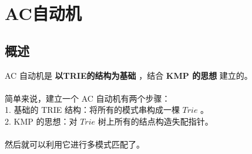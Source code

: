 \section{AC自动机}
    \subsection{概述}
        AC 自动机是 \textbf{以TRIE的结构为基础} ，结合 \textbf{KMP 的思想} 建立的。\\\\
        简单来说，建立一个 AC 自动机有两个步骤：\\
        1.  基础的 TRIE 结构：将所有的模式串构成一棵 $Trie$ 。\\
        2.  KMP 的思想：对 $Trie$ 树上所有的结点构造失配指针。\\\\
        然后就可以利用它进行多模式匹配了。
